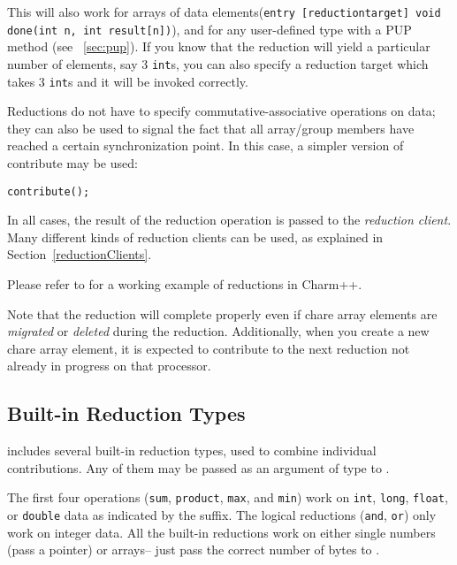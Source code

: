 This will also work for arrays of data 
elements({\tt entry [reductiontarget] void done(int n, int result[n])}), 
and for any user-defined type with a PUP method
(see ~\ref{sec:pup}). If you know that the reduction will yield a particular
number of elements, say 3 {\tt int}s, you can also specify a reduction target which
takes 3 {\tt int}s and it will be invoked correctly. 

Reductions do not have to specify commutative-associative operations on data;
they can also be used to signal the fact that all array/group members
have reached a certain synchronization point. In this case, a simpler version
of contribute may be used:


\begin{alltt}
    contribute();
\end{alltt}

In all cases, the result of the reduction operation is passed to the {\em reduction
client}.  Many different kinds of reduction clients can be used, as
explained in Section~\ref{reductionClients}.

Please refer to  for a working example of
reductions in Charm++.

Note that the reduction will complete properly even if chare array elements are {\em migrated}
or {\em deleted} during the reduction. Additionally, when you create a new chare array element, 
it is expected to contribute to the next reduction not already in progress on that
processor. 

\subsection{Built-in Reduction Types}
\label{builtin_reduction}

\charmpp{} includes several built-in reduction types, used to combine 
individual contributions.  Any of them may be passed as an argument of type
 to .

The first four operations ({\tt sum}, {\tt product}, {\tt max}, and {\tt min}) work on {\tt int},
{\tt long}, {\tt float}, or {\tt double} data as indicated by the suffix.  The logical
reductions ({\tt and}, {\tt or}) only work on integer data.  All the built-in
reductions work on either single numbers (pass a pointer) or arrays-- just
pass the correct number of bytes to .

